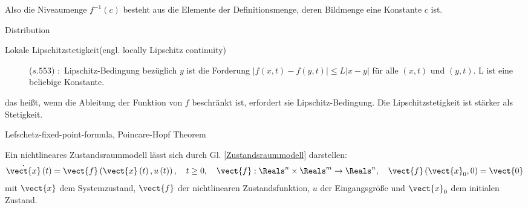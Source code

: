 \vspace{-0.8em}
Also die Niveaumenge $f^{-1}\left ( c \right )$ besteht aus die Elemente der Definitionsmenge, deren Bildmenge eine Konstante $c$ ist.
\begin{description}
\item[Distribution]
\end{description}
\vspace{-0.8em}
\begin{description}
\item[Lokale Lipschitzstetigkeit(engl. locally Lipschitz continuity)]\cite{bronstein2012taschenbuch}($s.553$)
:~Lipschitz-Bedingung bezüglich $y$ ist die Forderung $\left | f\left ( x,t \right ) -f\left ( y,t \right )\right |\leq L\left | x-y \right |$ für alle $\left ( x,t \right )$ und $\left ( y,t \right )$. L ist eine beliebige Konstante.
\end{description}
\vspace{-0.8em}
das heißt, wenn die Ableitung der Funktion von $f$ beschränkt ist, erfordert sie Lipschitz-Bedingung. Die Lipschitzstetigkeit ist stärker als Stetigkeit.


Lefschetz-fixed-point-formula, Poincare-Hopf Theorem %









Ein nichtlineares Zustandsraummodell lässt sich durch Gl. \ref{Zustandsraummodell} darstellen:
\begin{eqnarray}
\dot{\vect{x}}\left ( t \right )=\vect{f}\left (\vect{x}\left ( t \right ),u\left ( t \right )  \right ),~~~t\geq 0,~~~\vect{f}:\Reals^{n}\times\Reals^{m}\to\Reals^{n},~~~\vect{f}\left ({\vect{x}_{0}},0  \right )=\vect{0}
\label{Zustandsraummodell}
\end{eqnarray}
mit $\vect{x}$ dem Systemzustand, $\vect{f}$ der nichtlinearen Zustandsfunktion, $u$ der Eingangsgröße und $\vect{x}_{0}$ dem initialen Zustand. 

